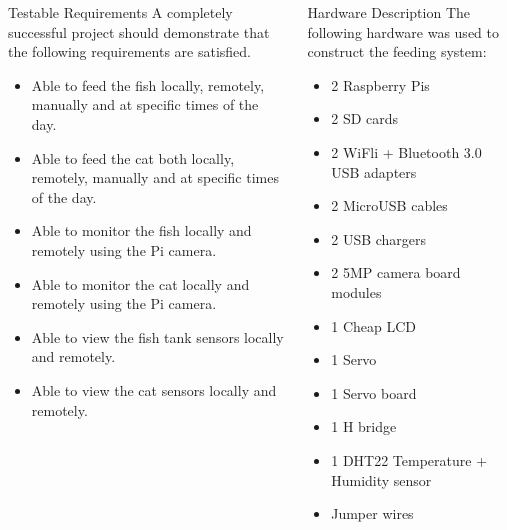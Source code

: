 \documentclass[final]{beamer}
\newlength{\onecolwid}
\newlength{\twocolwid}
\begin{document}
\begin{frame}[t]
\begin{columns}[t]
\begin{column}{\twocolwid}
\begin{columns}[t,totalwidth=\twocolwid]
\begin{column}{\onecolwid}
\begin{block}{Testable Requirements}
A completely successful project should demonstrate that the following requirements are satisfied.
\begin{itemize}
    \item Able to feed the fish locally, remotely, manually and at specific times of the day.
    \item Able to feed the cat both locally, remotely, manually and at specific times of the day.
    \item Able to monitor the fish locally and remotely using the Pi camera.
    \item Able to monitor the cat locally and remotely using the Pi camera.
    \item Able to view the fish tank sensors locally and remotely.
    \item Able to view the cat sensors locally and remotely.
\end{itemize}

\end{block}


\end{column} %

\begin{column}{\onecolwid} %

\begin{block}{Hardware Description}
The following hardware was used to construct the feeding system:

\begin{itemize}
\item 2 Raspberry Pis
\item 2 SD cards
\item 2 WiFli + Bluetooth 3.0 USB adapters
\item 2 MicroUSB cables
\item 2 USB chargers
\item 2 5MP camera board modules
\item 1 Cheap LCD
\item 1 Servo
\item 1 Servo board
\item 1 H bridge
\item 1 DHT22 Temperature + Humidity sensor
\item Jumper wires
\end{itemize}


\end{block}
\end{column}
\end{columns}
\end{column}
\end{columns}
\end{frame}
\end{document}
